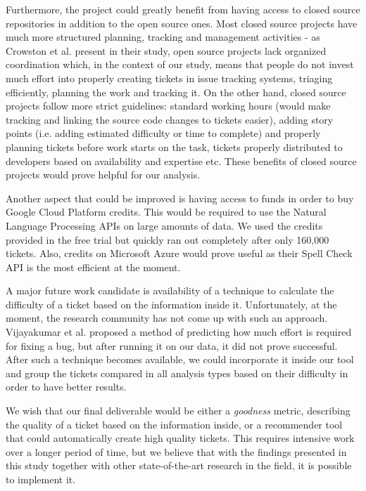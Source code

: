 \documentclass{mpaper}
\begin{document}
Furthermore, the project could greatly benefit from having access to closed source repositories in addition to the 
open source ones. Most closed source projects have much more structured planning, tracking and management activities - as 
Crowston et al. \cite{crowston2012free} present in their study, open source projects lack organized coordination which,
in the context of our study, means that people do not invest much effort into properly creating tickets in issue tracking 
systems, triaging efficiently, planning the work and tracking it. On the other hand, closed source projects follow 
more strict guidelines: standard working hours (would make tracking and linking the source code changes to tickets easier), 
adding story points (i.e. adding estimated difficulty or time to complete) and properly planning tickets before work 
starts on the task, tickets properly distributed to developers based on availability and expertise etc. These benefits 
of closed source projects would prove helpful for our analysis.

Another aspect that could be improved is having access to funds in order to buy Google Cloud Platform credits. This 
would be required to use the Natural Language Processing APIs on large amounts of data. We used the credits provided 
in the free trial but quickly ran out completely after only 160,000 tickets. Also, credits on Microsoft Azure would 
prove useful as their Spell Check API is the most efficient at the moment.

A major future work candidate is availability of a technique to calculate the difficulty of a ticket based on the information
inside it. Unfortunately, at the moment, the research community has not come up with such an approach. 
Vijayakumar et al. \cite{vijayakumar2014much} proposed a method of predicting how much effort is required for fixing 
a bug, but after running it on our data, it did not prove successful. After such a technique becomes available, we could 
incorporate it inside our tool and group the tickets compared in all analysis types based on their difficulty in order to 
have better results.

We wish that our final deliverable would be either a \emph{goodness} metric, describing the quality of a ticket based 
on the information inside, or a recommender tool that could automatically create high quality tickets. This requires 
intensive work over a longer period of time, but we believe that with the findings presented in this study together 
with other state-of-the-art research in the field, it is possible to implement it.
\end{document}
